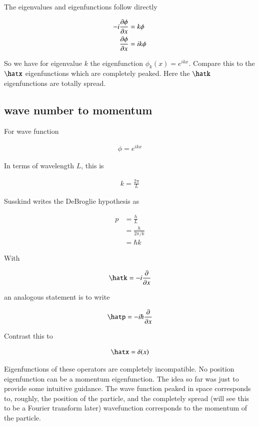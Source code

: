 The eigenvalues and eigenfunctions follow directly

\begin{align*}
-i \frac{\partial {\phi}}{\partial {x}} &= k \phi \\
\frac{\partial {\phi}}{\partial {x}} &= i k \phi
\end{align*}

So we have for eigenvalue $k$ the eigenfunction $\phi_k(x) = e^{i k x}$.  Compare this to the $\hatx$ eigenfunctions which are completely peaked.  Here the $\hatk$ eigenfunctions are totally spread.

\subsection{wave number to momentum }

For wave function

\begin{align*}
\phi = e^{ikx}
\end{align*}

In terms of wavelength $L$, this is

\begin{align*}
k = \frac{2\pi}{L}
\end{align*}

Susskind writes the DeBroglie hypothesis as 

\begin{align*}
p 
&= \frac{h}{L} \\
&= \frac{h}{2\pi/k} \\
&= {\hbar}k
\end{align*}

With

\begin{align*}
\hatk = -i\PD{x}{}
\end{align*}

an analogous statement is to write

\begin{align*}
\hatp = -i\hbar \PD{x}{}
\end{align*}

Contrast this to 

\begin{align*}
\hatx = \delta(x)
\end{align*}

Eigenfunctions of these operators are completely incompatible.  No position eigenfunction can be a momentum eigenfunction.  The idea so far was just to provide some intuitive guidance.  The wave function peaked in space corresponds to, roughly, the position of the particle, and the completely spread (will see this to be a Fourier transform later) wavefunction corresponds to the momentum of the particle.

